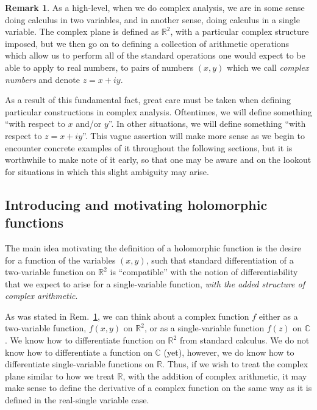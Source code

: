 \documentclass[aps,pra,showpacs,notitlepage,onecolumn,superscriptaddress,nofootinbib]{revtex4-1}
\theoremstyle{definition}
\newtheorem{remark}{Remark}[section]
\newcommand{\hhrulefill}{\hspace{-1.5em} \hrulefill}
\begin{document}
\begin{remark}
  \label{rem:r2_vs_c}
As a high-level, when we do complex analysis, we are in some sense doing calculus in two variables, and in another sense, doing calculus in a single variable. The complex plane is defined as $\mathbb{R}^{2}$,
with a particular complex structure imposed, but we then go on to defining a collection of arithmetic operations which allow us to perform all of the standard operations one would expect to be able to apply to real numbers,
to pairs of numbers $(x, y)$ which we call \emph{complex numbers} and denote $z = x + iy$.

As a result of this fundamental fact, great care must be taken when defining particular constructions in complex analysis. Oftentimes, we will define something ``with respect to $x$ and/or $y$''. In other situations,
we will define something ``with respect to $z = x + iy$''. This vague assertion will make more sense as we begin to encounter concrete examples of it throughout the following sections, but it is worthwhile to make note
of it early, so that one may be aware and on the lookout for situations in which this slight ambiguity may arise.
\end{remark}

\hhrulefill

\subsection{Introducing and motivating holomorphic functions}

\noindent The main idea motivating the definition of a holomorphic function is the desire for a function of the variables $(x, y)$, such that standard differentiation of a two-variable function on $\mathbb{R}^2$
is ``compatible'' with the notion of differentiability that we expect to arise for a single-variable function, \emph{with the added structure of complex arithmetic}.

As was stated in Rem.~\ref{rem:r2_vs_c}, we can think about a complex function $f$ either as a two-variable function, $f(x, y)$ on $\mathbb{R}^2$, or as a single-variable function $f(z)$ on $\mathbb{C}$.
We know how to differentiate function on $\mathbb{R}^2$ from standard calculus. We do not know how to differentiate a function on $\mathbb{C}$ (yet), however, we do know how to differentiate single-variable
functions on $\mathbb{R}$. Thus, if we wish to treat the complex plane similar to how we treat $\mathbb{R}$, with the addition of complex arithmetic, it may make sense to define the derivative of a complex function on the
same way as it is defined in the real-single variable case.
\end{document}
